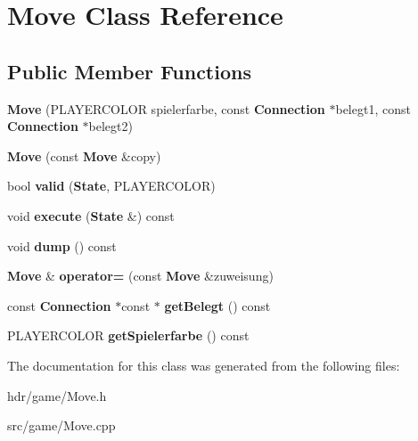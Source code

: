 \section{Move Class Reference}
\label{class_move}
\subsection*{Public Member Functions}
\begin{DoxyCompactItemize}
\item 
{\bfseries Move} (P\-L\-A\-Y\-E\-R\-C\-O\-L\-O\-R spielerfarbe, const {\bf Connection} $\ast$belegt1, const {\bf Connection} $\ast$belegt2)\label{class_move_a6040abbc43f535592305cb0c09b9be0a}

\item 
{\bfseries Move} (const {\bf Move} \&copy)\label{class_move_acbc7c49812f751a195fc4912f572c80f}

\item 
bool {\bfseries valid} ({\bf State}, P\-L\-A\-Y\-E\-R\-C\-O\-L\-O\-R)\label{class_move_a2651074156a1ab353be5f9b8c64649ee}

\item 
void {\bfseries execute} ({\bf State} \&) const \label{class_move_ae647057baca3c5d56261887a4eb2206f}

\item 
void {\bfseries dump} () const \label{class_move_a5fd65957977d9e30fd8898fa4a14ac56}

\item 
{\bf Move} \& {\bfseries operator=} (const {\bf Move} \&zuweisung)\label{class_move_a2cae41881447ddc9496cff2800ce01e2}

\item 
const {\bf Connection} $\ast$const $\ast$ {\bfseries get\-Belegt} () const \label{class_move_a6de84bf9dd651f869956186deb098ccb}

\item 
P\-L\-A\-Y\-E\-R\-C\-O\-L\-O\-R {\bfseries get\-Spielerfarbe} () const \label{class_move_a55523136edbb791118cd74be733a3670}

\end{DoxyCompactItemize}


The documentation for this class was generated from the following files\-:\begin{DoxyCompactItemize}
\item 
hdr/game/Move.\-h\item 
src/game/Move.\-cpp\end{DoxyCompactItemize}
